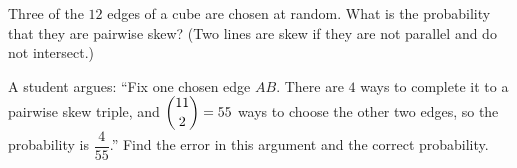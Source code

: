 Three of the $12$ edges of a cube are chosen at random. What is the probability that they are pairwise skew? (Two lines are skew if they are not parallel and do not intersect.)

A student argues: ``Fix one chosen edge $AB$. There are $4$ ways to complete it to a pairwise skew triple, and $\dbinom{11}{2}=55$ ways to choose the other two edges, so the probability is $\dfrac{4}{55}$.'' Find the error in this argument and the correct probability.
